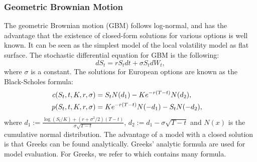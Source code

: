 \documentclass[11pt,reqno]{article}
\numberwithin{equation}{section}
\begin{document}
\subsubsection{Geometric Brownian Motion}
The geometric Brownian motion (GBM) follows log-normal, and has the advantage that the existence of closed-form solutions for various options is well known.
 It can be seen as the simplest model of the local volatility model as flat surface.
 The stochastic differential equation for GBM is the following:
\begin{equation}\label{eqn:5}
    dS_t = rS_tdt + \sigma S_tdW_t,
\end{equation}
where $\sigma$ is a constant.
 The solutions for European options are known as the Black-Scholes formula:
\begin{align*}%
    c(S_t,t,K,r,\sigma) &= S_tN(d_1) - Ke^{-r(T-t)}N(d_2),\cr
    p(S_t,t,K,r,\sigma) &= Ke^{-r(T-t)}N(-d_1) - S_tN(-d_2),
\end{align*}
where $d_1:=\frac{\log(S_t/K)+(r+\sigma^2/2)(T-t)}{\sigma\sqrt{T-t}}$,
$d_2:=d_1-\sigma\sqrt{T-t}$ and $N(x)$ is the cumulative normal distribution.
The advantage of a model with a closed solution is that Greeks can be found analytically. 
{Greeks' analytic formula are used for model evaluation.}
For Greeks, we refer to \cite{LARGUINHO2013}
 which contains many formula.

\end{document}

